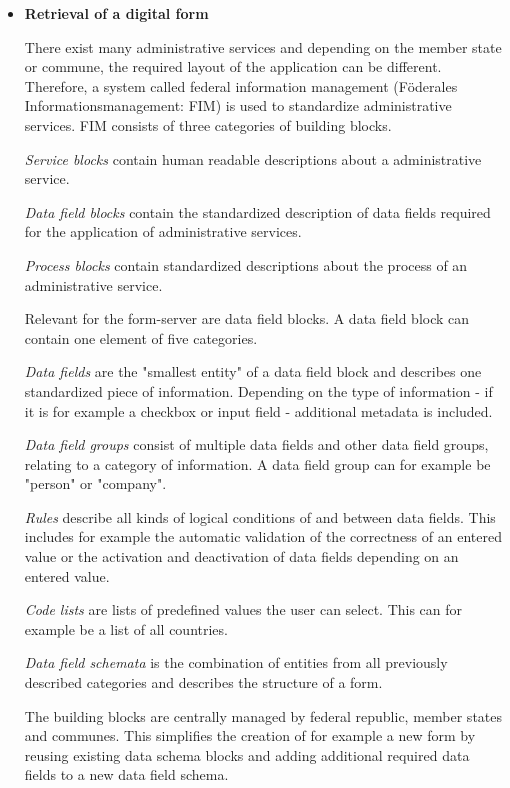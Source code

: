 \documentclass[
     12pt,         %
     a4paper,      %
     BCOR=10mm,version=first,     %
     DIV=14,version=first,        %
     ]{scrreprt}
\begin{document}
\begin{itemize}
    \item \textbf{Retrieval of a digital form}
    
    There exist many administrative services and depending on the member state or commune, the required layout of the application can be different. Therefore, a system called federal information management (Föderales Informationsmanagement: FIM) is used to standardize administrative services. FIM consists of three categories of building blocks.
    
    \textit{Service blocks} contain human readable descriptions about a administrative service.
    
    \textit{Data field blocks} contain the standardized description of data fields required for the application of administrative services.
    
    \textit{Process blocks} contain standardized descriptions about the process of an administrative service.

    Relevant for the form-server are data field blocks. A data field block can contain one element of five categories.
    
    \textit{Data fields} are the "smallest entity" of a data field block and describes one standardized piece of information. Depending on the type of information - if it is for example a checkbox or input field - additional metadata is included.
    
    \textit{Data field groups} consist of multiple data fields and other data field groups, relating to a category of information. A data field group can for example be "person" or "company".
    
    \textit{Rules} describe all kinds of logical conditions of and between data fields. This includes for example the automatic validation of the correctness of an entered value or the activation and deactivation of data fields depending on an entered value.
    
    \textit{Code lists} are lists of predefined values the user can select. This can for example be a list of all countries.
    
    \textit{Data field schemata} is the combination of entities from all previously described categories and describes the structure of a form.
    
    The building blocks are centrally managed by federal republic, member states and communes. This simplifies the creation of for example a new form by reusing existing data schema blocks and adding additional required data fields to a new data field schema.
    

\end{itemize}
\end{document}
